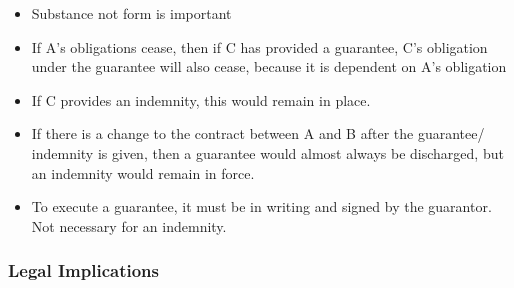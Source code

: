 \documentclass[
]{article}
\providecommand{\tightlist}{%
  \setlength{\itemsep}{0pt}\setlength{\parskip}{0pt}}
\begin{document}
\begin{itemize}
\tightlist
\item
  Substance not form is important
\item
  If A's obligations cease, then if C has provided a guarantee, C's
  obligation under the guarantee will also cease, because it is
  dependent on A's obligation
\item
  If C provides an indemnity, this would remain in place.
\item
  If there is a change to the contract between A and B after the
  guarantee/ indemnity is given, then a guarantee would almost always be
  discharged, but an indemnity would remain in force.
\item
  To execute a guarantee, it must be in writing and signed by the
  guarantor. Not necessary for an indemnity.
\end{itemize}

\hypertarget{legal-implications}{%
\subsubsection{Legal Implications}\label{legal-implications}}
\end{document}
